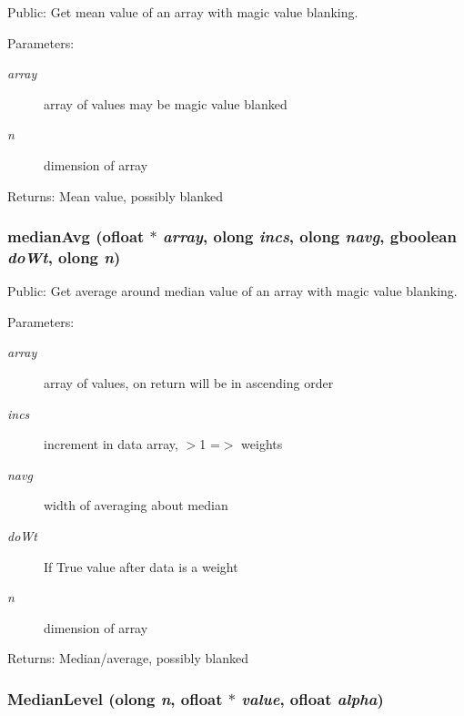 Public: Get mean value of an array with magic value blanking. 

\begin{Desc}
\item[Parameters:]
\begin{description}
\item[{\em array}]array of values may be magic value blanked \item[{\em n}]dimension of array \end{description}
\end{Desc}
\begin{Desc}
\item[Returns:]Mean value, possibly blanked \end{Desc}
\subsubsection{ median\-Avg ({\bf ofloat} $\ast$ {\em array}, {\bf olong} {\em incs}, {\bf olong} {\em navg}, gboolean {\em do\-Wt}, {\bf olong} {\em n})}\label{ObitUtil_8c_a3}


Public: Get average around median value of an array with magic value blanking. 

\begin{Desc}
\item[Parameters:]
\begin{description}
\item[{\em array}]array of values, on return will be in ascending order \item[{\em incs}]increment in data array, $>$1 =$>$ weights \item[{\em navg}]width of averaging about median \item[{\em do\-Wt}]If True value after data is a weight \item[{\em n}]dimension of array \end{description}
\end{Desc}
\begin{Desc}
\item[Returns:]Median/average, possibly blanked \end{Desc}
\subsubsection{ Median\-Level ({\bf olong} {\em n}, {\bf ofloat} $\ast$ {\em value}, {\bf ofloat} {\em alpha})}\label{ObitUtil_8c_a5}


